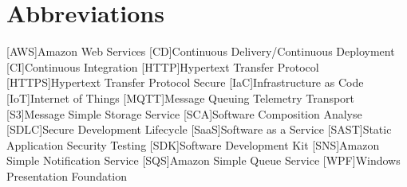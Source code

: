 \chapter*{Abbreviations}

\begin{acronym}
    [AWS]{Amazon Web Services}
    [CD]{Continuous Delivery/Continuous Deployment}
    [CI]{Continuous Integration}
    [HTTP]{Hypertext Transfer Protocol}
    [HTTPS]{Hypertext Transfer Protocol Secure}    
    [IaC]{Infrastructure as Code}
    [IoT]{Internet of Things}
    [MQTT]{Message Queuing Telemetry Transport}
    [S3]{Message Simple Storage Service}
    [SCA]{Software Composition Analyse}
    [SDLC]{Secure Development Lifecycle}
    [SaaS]{Software as a Service}
    [SAST]{Static Application Security Testing}  
    [SDK]{Software Development Kit}
    [SNS]{Amazon Simple Notification Service}
    [SQS]{Amazon Simple Queue Service}
    [WPF]{Windows Presentation Foundation}    
\end{acronym}
